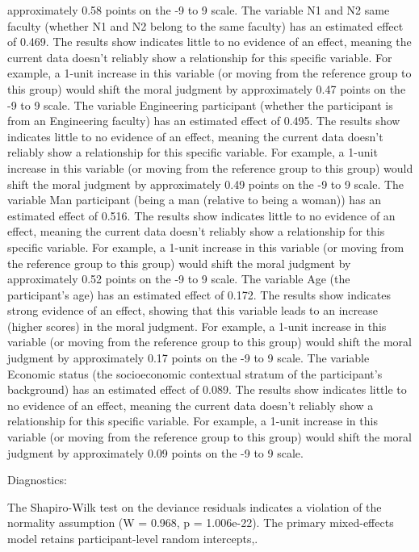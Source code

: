 \documentclass[11pt]{article}
\begin{document}
approximately 0.58 points on the -9 to 9 scale. The variable N1 and N2 same faculty (whether N1 and N2 belong to the same faculty) has an estimated effect of 0.469. The results show indicates little to no evidence of an effect, meaning the current data doesn't reliably show a relationship for this specific variable. For example, a 1-unit increase in this variable (or moving from the reference group to this group) would shift the moral judgment by approximately 0.47 points on the -9 to 9 scale. The variable Engineering participant (whether the participant is from an Engineering faculty) has an estimated effect of 0.495. The results show indicates little to no evidence of an effect, meaning the current data doesn't reliably show a relationship for this specific variable. For example, a 1-unit increase in this variable (or moving from the reference group to this group) would shift the moral judgment by approximately 0.49 points on the -9 to 9 scale. The variable Man participant (being a man (relative to being a woman)) has an estimated effect of 0.516. The results show indicates little to no evidence of an effect, meaning the current data doesn't reliably show a relationship for this specific variable. For example, a 1-unit increase in this variable (or moving from the reference group to this group) would shift the moral judgment by approximately 0.52 points on the -9 to 9 scale. The variable Age (the participant's age) has an estimated effect of 0.172. The results show indicates strong evidence of an effect, showing that this variable leads to an increase (higher scores) in the moral judgment. For example, a 1-unit increase in this variable (or moving from the reference group to this group) would shift the moral judgment by approximately 0.17 points on the -9 to 9 scale. The variable Economic status (the socioeconomic contextual stratum of the participant's background) has an estimated effect of 0.089. The results show indicates little to no evidence of an effect, meaning the current data doesn't reliably show a relationship for this specific variable. For example, a 1-unit increase in this variable (or moving from the reference group to this group) would shift the moral judgment by approximately 0.09 points on the -9 to 9 scale.

Diagnostics:

The Shapiro-Wilk test on the deviance residuals indicates a violation of the normality assumption (W = 0.968, p = 1.006e-22). The primary mixed-effects model retains participant-level random intercepts,.
\end{document}
